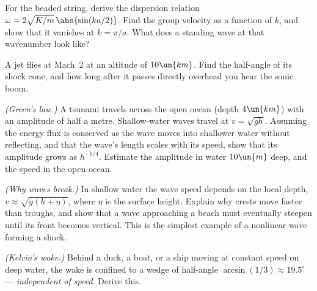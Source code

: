 \begin{problems}
\core For the beaded string, derive the dispersion relation $\omega = 2\sqrt{K/m}\,\abs{\sin(ka/2)}$. Find the group velocity as a function of $k$, and show that it vanishes at $k=\pi/a$. What does a standing wave at that wavenumber look like?

 A jet flies at Mach~2 at an altitude of $10\un{km}$. Find the half-angle of its shock cone, and how long after it passes directly overhead you hear the sonic boom.

 \emph{(Green's law.)} A tsunami travels across the open ocean (depth $4\un{km}$) with an amplitude of half a metre. Shallow-water waves travel at $v = \sqrt{gh}$. Assuming the energy flux is conserved as the wave moves into shallower water without reflecting, and that the wave's length scales with its speed, show that its amplitude grows as $h^{-1/4}$. Estimate the amplitude in water $10\un{m}$ deep, and the speed in the open ocean.

 \emph{(Why waves break.)} In shallow water the wave speed depends on the local depth, $v\approx\sqrt{g(h+\eta)}$, where $\eta$ is the surface height. Explain why crests move faster than troughs, and show that a wave approaching a beach must eventually steepen until its front becomes vertical. This is the simplest example of a nonlinear wave forming a shock.

 \emph{(Kelvin's wake.)} Behind a duck, a boat, or a ship moving at constant speed on deep water, the wake is confined to a wedge of half-angle $\arcsin(1/3)\approx19.5^\circ$ --- \emph{independent of speed}. Derive this.
\end{problems}

\begin{reading}
\end{reading}
